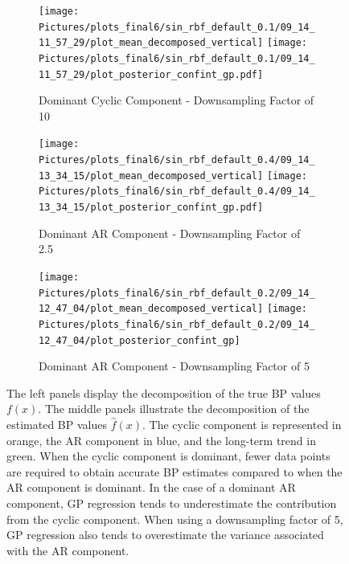 \begin{figure}

\begin{subfigure}{\textwidth}
    \centering
    \texttt{[image: 
    Pictures/plots\_final6/sin\_rbf\_default\_0.1/09\_14\_11\_57\_29/plot\_mean\_decomposed\_vertical]}
    \texttt{[image: 
    Pictures/plots\_final6/sin\_rbf\_default\_0.1/09\_14\_11\_57\_29/plot\_posterior\_confint\_gp.pdf]}
  \caption{Dominant Cyclic Component - Downsampling Factor of 10}
\end{subfigure}

\begin{subfigure}{\textwidth}
    \centering
    \texttt{[image: 
        Pictures/plots\_final6/sin\_rbf\_default\_0.4/09\_14\_13\_34\_15/plot\_mean\_decomposed\_vertical]}
    \texttt{[image: 
         Pictures/plots\_final6/sin\_rbf\_default\_0.4/09\_14\_13\_34\_15/plot\_posterior\_confint\_gp.pdf]}
  \caption{Dominant AR Component - Downsampling Factor of 2.5}
    \label{subfig:mean-decomposed-ar-low-downsampling}
\end{subfigure}\hfill

\begin{subfigure}{\textwidth}
    \centering
    \texttt{[image: 
    Pictures/plots\_final6/sin\_rbf\_default\_0.2/09\_14\_12\_47\_04/plot\_mean\_decomposed\_vertical]}
    \texttt{[image: 
       Pictures/plots\_final6/sin\_rbf\_default\_0.2/09\_14\_12\_47\_04/plot\_posterior\_confint\_gp]}
  \caption{Dominant AR Component - Downsampling Factor of 5}
    \label{subfig:mean-decomposed-ar}
\end{subfigure}\hfill
\label{fig:mean-decomposed-ar-cyclic}
\caption[Dominant Cyclic Component vs. Dominant AR Component: Decomposition of $f(x)$]{
    The left panels display the decomposition of the true BP values $f(x)$.
    The middle panels illustrate the decomposition of the estimated BP values $\hat{f}(x)$.
    The cyclic component is represented in orange,
    the AR component in blue, and the long-term trend in green.
    When the cyclic component is dominant, fewer data points are required to obtain accurate BP estimates
    compared to when the AR component is dominant.
    In the case of a dominant AR component, GP regression tends to underestimate
    the contribution from the cyclic component.
    When using a downsampling factor of 5, GP regression also tends to overestimate
    the variance associated with the AR component.
}

\end{figure}

